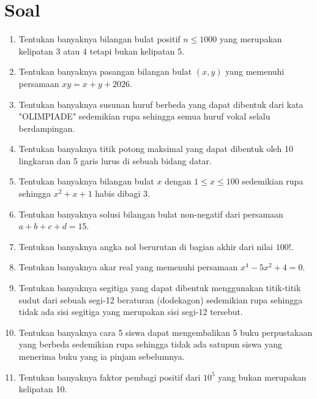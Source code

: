\documentclass[12pt]{scrartcl}
\begin{document}
\renewcommand*\contentsname{Daftar Isi}
\tableofcontents

\newpage
\section*{Soal}
\begin{enumerate}
\item Tentukan banyaknya bilangan bulat positif $n \le 1000$ yang merupakan kelipatan 3 atau 4 tetapi bukan kelipatan 5.

\item Tentukan banyaknya pasangan bilangan bulat $(x,y)$ yang memenuhi persamaan $xy = x + y + 2026$.

\item Tentukan banyaknya susunan huruf berbeda yang dapat dibentuk dari kata "OLIMPIADE" sedemikian rupa sehingga semua huruf vokal selalu berdampingan.

\item Tentukan banyaknya titik potong maksimal yang dapat dibentuk oleh 10 lingkaran dan 5 garis lurus di sebuah bidang datar.

\item Tentukan banyaknya bilangan bulat $x$ dengan $1 \le x \le 100$ sedemikian rupa sehingga $x^2 + x + 1$ habis dibagi 3.

\item Tentukan banyaknya solusi bilangan bulat non-negatif dari persamaan $a + b + c + d = 15$.

\item Tentukan banyaknya angka nol berurutan di bagian akhir dari nilai $100!$.

\item Tentukan banyaknya akar real yang memenuhi persamaan $x^4 - 5x^2 + 4 = 0$.

\item Tentukan banyaknya segitiga yang dapat dibentuk menggunakan titik-titik sudut dari sebuah segi-12 beraturan (dodekagon) sedemikian rupa sehingga tidak ada sisi segitiga yang merupakan sisi segi-12 tersebut.

\item Tentukan banyaknya cara 5 siswa dapat mengembalikan 5 buku perpustakaan yang berbeda sedemikian rupa sehingga tidak ada satupun siswa yang menerima buku yang ia pinjam sebelumnya.

\item Tentukan banyaknya faktor pembagi positif dari $10^5$ yang bukan merupakan kelipatan 10.


\end{enumerate}
\end{document}
